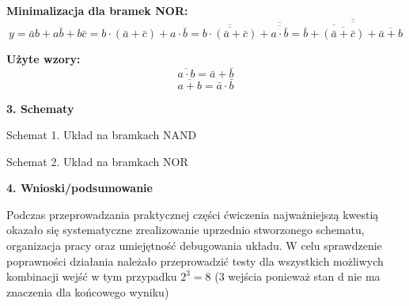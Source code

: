 \documentclass[12pt,a4paper]{report}
\begin{document}
	{\bfseries Minimalizacja dla bramek NOR:}
	\begin{displaymath}
	y=\bar{a}b+a\bar{b}+b\bar{c}
	=b\cdot(\bar{a}+\bar{c})+a\cdot\bar{b}
	=\overline{\overline{b\cdot(\bar{a}+\bar{c})}}+\overline{\overline{a\cdot\bar{b}}}
	=\overline{\overline{\overline{\bar{b}+\overline{(\bar{a}+\bar{c})}}+\overline{\bar{a}+b}}}
	\end{displaymath}
	
	
	{\bfseries Użyte wzory:}
	\begin{equation}
	\overline{a\cdot b}=\bar{a}+\bar{b}
	\end{equation}
	\begin{equation}
	\overline{a+b}=\bar{a}\cdot\bar{b}
	\end{equation}
	
	\vspace{0.5cm}
	{\large\bfseries 3. Schematy}
	
	\vspace{0.5cm}
	\begin{center}
		Schemat 1. Układ na bramkach NAND
	\end{center}
	
	\vspace{1.0cm}
	\begin{center}
		Schemat 2. Układ na bramkach NOR
	\end{center}
	
	
	\vspace{0.5cm}
	{\large\bfseries 4. Wnioski/podsumowanie\\}
	
	Podczas przeprowadzania praktycznej części ćwiczenia najważniejszą kwestią okazało się systematyczne zrealizowanie uprzednio stworzonego schematu, organizacja pracy oraz umiejętność debugowania układu. W celu sprawdzenie poprawności działania należało przeprowadzić testy dla wszystkich możliwych kombinacji wejść w tym przypadku $2^3 = 8$ (3 wejścia ponieważ stan d nie ma znaczenia dla końcowego wyniku)
	
\end{document}
